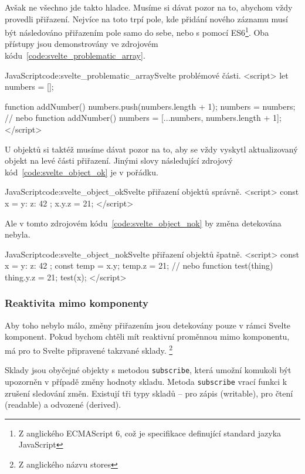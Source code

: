 \documentclass[
  master,
  program=ainf,
  tables=false,
  sourcecodes,
  glossaries,
  index
]{kidiplom}
\begin{document}
Avšak ne všechno jde takto hladce. Musíme si dávat pozor na to, abychom vždy provedli přiřazení.
Nejvíce na toto trpí pole, kde přidání nového záznamu musí být následováno přiřazením pole
samo do sebe, nebo s pomocí ES6\footnote{Z anglického ECMAScript 6, což je specifikace definující standard jazyka JavaScript}. Oba přístupy jsou demonstrovány ve zdrojovém kódu~\ref{code:svelte_problematic_array}.

  \begin{kicode}{JavaScript}{code:svelte_problematic_array}{Svelte problémové části.}
    <script>
      let numbers = [];

      function addNumber() {
        numbers.push(numbers.length + 1);
        numbers = numbers;
      }
      // nebo
      function addNumber() {
        numbers = [...numbers, numbers.length + 1];
      }
    </script>
  \end{kicode}


U objektů si taktéž musíme dávat pozor na to, aby se vždy vyskytl aktualizovaný objekt na levé části přiřazení.
Jinými slovy následující zdrojový kód~\ref{code:svelte_object_ok} je v pořádku.

  \begin{kicode}{JavaScript}{code:svelte_object_ok}{Svelte přiřazení objektů správně.}
    <script>
      const x = { y: { z: 42 }};
      x.y.z = 21;
    </script>
  \end{kicode}

Ale v tomto zdrojovém kódu~\ref{code:svelte_object_nok} by změna detekována nebyla.

  \begin{kicode}{JavaScript}{code:svelte_object_nok}{Svelte přiřazení objektů špatně.}
    <script>
      const x = { y: { z: 42 }};
      const temp = x.y;
      temp.z = 21;
      // nebo
      function test(thing) {
        thing.y.z = 21;
      }
      test(x);
    </script>
  \end{kicode}


\subsubsection{Reaktivita mimo komponenty}

Aby toho nebylo málo, změny přiřazením jsou detekovány pouze v rámci Svelte komponent. Pokud bychom
chtěli mít reaktivní proměnnou mimo komponentu, má pro to Svelte \cite{svelte} připravené takzvané sklady.
\footnote{Z anglického názvu stores} 

Sklady jsou obyčejné objekty s metodou {\tt subscribe}, která umožní komukoli být upozorněn v případě změny
hodnoty skladu. Metoda {\tt subscribe} vrací funkci k zrušení sledování změn. Existují tři typy 
skladů -- pro zápis (writable), pro čtení (readable) a odvozené (derived).
\end{document}

